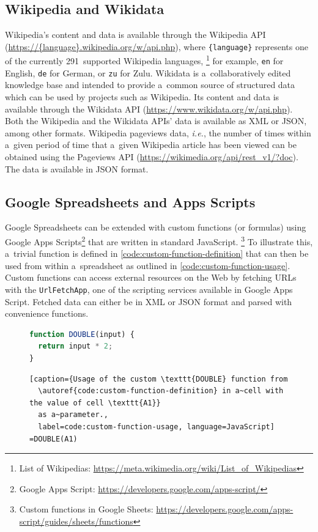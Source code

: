 \documentclass{sig-alternate-05-2015}
\newcommand{\inlinelistingsize}{\fontsize{8pt}{11pt}}
\let\oldurl\url
\renewcommand{\url}[1]{\inlinelistingsize\oldurl{#1}}
\begin{document}
\subsection{Wikipedia and Wikidata}

Wikipedia's content and data is available through the Wikipedia API
(\url{https://{language}.wikipedia.org/w/api.php}),
where \texttt{\{language\}} represents one of the currently 291~supported Wikipedia languages,%
\footnote{List of Wikipedias:
\url{https://meta.wikimedia.org/wiki/List_of_Wikipedias}}
for example, \texttt{en} for English, \texttt{de} for German, or \texttt{zu} for Zulu. 
Wikidata is a~collaboratively edited knowledge base and intended to provide
a~common source of structured data which can be used by projects such as Wikipedia.
Its content and data is available through the Wikidata API
(\url{https://www.wikidata.org/w/api.php}).
Both the Wikipedia and the Wikidata APIs' data is available as XML or JSON, among other formats.
Wikipedia pageviews data, \emph{i.e.}, the number of times within a~given period of time
that a~given Wikipedia article has been viewed can be obtained using the Pageviews API
(\url{https://wikimedia.org/api/rest_v1/?doc}).
The data is available in JSON format.

\subsection{Google Spreadsheets and Apps Scripts}

Google Spreadsheets can be extended with custom functions (or formulas)
using Google Apps Scripts\footnote{Google Apps Script:
\url{https://developers.google.com/apps-script/}}
that are written in standard JavaScript.%
\footnote{Custom functions in Google Sheets:
\url{https://developers.google.com/apps-script/guides/sheets/functions}}
To illustrate this, a~trivial function is defined in \autoref{code:custom-function-definition}
that can then be used from within a~spreadsheet as outlined in
\autoref{code:custom-function-usage}.
Custom functions can access external resources on the Web by fetching URLs
with the \texttt{UrlFetchApp}, one of the scripting services available in
Google Apps Script.
Fetched data can either be in XML or JSON format and parsed with convenience functions.

\vspace{-1.5em}
\begin{figure}[h!]
\begin{lstlisting}[caption={Custom Google Sheets function called \texttt{DOUBLE}.},
  label=code:custom-function-definition, language=JavaScript]
function DOUBLE(input) {
  return input * 2;
}
\end{lstlisting}
\vspace{-2.5em}
\begin{lstlisting}[caption={Usage of the custom \texttt{DOUBLE} function from
  \autoref{code:custom-function-definition} in a~cell with the value of cell \texttt{A1}}
  as a~parameter.,
  label=code:custom-function-usage, language=JavaScript]
=DOUBLE(A1)
\end{lstlisting}
\end{figure}
\end{document}
